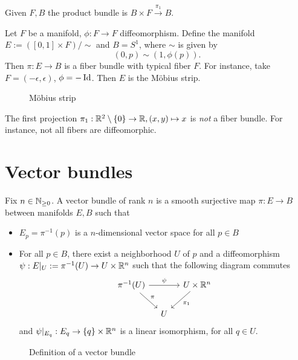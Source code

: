 \begin{eg}
    Given $F, B$ the product bundle is $B \times F \xrightarrow{\pi_1}   B$.
\end{eg}
\begin{eg}
    Let $F$ be a manifold, $\phi: F \to F$ diffeomorphism.
    Define the manifold $E := ([0, 1] \times F) / \sim$ and  $B = S^{1}$, where $\sim$ is given by
    \[
        (0, p) \sim (1, \phi(p))
    .\] 
Then $\pi:E\to B$ is a fiber bundle with typical fiber $F$.
    For instance, take $F = (-\epsilon, \epsilon)$, $\phi = -\operatorname{Id}$. Then $E$ is the M\"obius strip.
\begin{figure}[H]
    \centering
    \caption{M\"obius strip}
    \label{fig:mobius-strip}
\end{figure}
\end{eg}

\begin{eg}
The first projection    $\pi_1:\mathbb{R}^2\setminus\{0\}\to \mathbb{R}, (x,y)\mapsto x$ is \emph{not} a fiber bundle.
For instance, not all fibers are diffeomorphic.
\end{eg}

\filbreak
\section{Vector bundles}
\begin{definition}
    Fix $n \in  \mathbb{N}_{\ge 0}$. A vector bundle of rank $n$ is a smooth surjective map $\pi: E \to  B$ between manifolds $E, B$ such that 
    \begin{itemize}
        \item $E_p = \pi^{-1}(p)$ is a $n$-dimensional vector space for all $p \in B$ 
        \item For all $p \in B$, there exist a neighborhood $U$ of $p$ and a diffeomorphism $\psi: E|_U:=\pi^{-1}(U) \to  U \times \mathbb{R}^n$ such that the following diagram commutes
    \[
        \begin{tikzcd}[ column sep=1em ]
            \pi^{-1}(U)\arrow[rr, "\psi"] \arrow[dr, "\pi"]& &U \times \R^n \arrow[dl, "\pi_1"]\\
                                                     & U &
        \end{tikzcd}
    \]
    and $\psi|_{E_q}: E_q \to  \{q\} \times \mathbb{R}^n$ is a linear isomorphism, for all $q\in U$.
    \end{itemize}
\end{definition}

\begin{figure}[H]
    \centering
    \caption{Definition of a vector bundle}
    \label{fig:vector-bundle-definition}
\end{figure}


